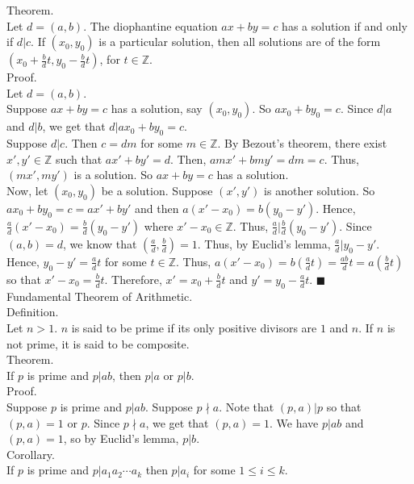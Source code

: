 \documentclass[twocolumn]{article}
\newcommand{\qed}{$\blacksquare$}
\newcommand{\integers}{\mathbb{Z}}
\begin{document}
Theorem. \\
Let $d = (a, b)$. The diophantine equation $ax + by = c$ has a solution if and only if $d | c$. If $(x_0, y_0)$ is a particular solution, then all solutions are of the form $\left( x_0 + \frac{b}{d}t, y_0 - \frac{b}{d}t \right)$, for $t \in \integers$. \\
Proof. \\
Let $d = (a, b)$. \\
Suppose $ax + by = c$ has a solution, say $(x_0, y_0)$. So $ax_0 + by_0 = c$. Since $d | a$ and $d | b$, we get that $d | ax_0 + by_0 = c$. \\
Suppose $d | c$. Then $c = dm$ for some $m \in \integers$. By Bezout's theorem, there exist $x', y' \in \integers$ such that $ax' + by' = d$. Then, $amx' + bmy' = dm = c$. Thus, $(mx', my')$ is a solution. So $ax + by = c$ has a solution. \\
Now, let $(x_0, y_0)$ be a solution. Suppose $(x', y')$ is another solution. So $ax_0 + by_0 = c = ax' + by'$ and then $a(x' - x_0) = b(y_0 - y')$. Hence, $\frac{a}{d}(x' - x_0) = \frac{b}{d}(y_0 - y')$ where $x' - x_0 \in \integers$. Thus, $\frac{a}{d} | \frac{b}{d}(y_0 - y')$. Since $(a, b) = d$, we know that $\left( \frac{a}{d}, \frac{b}{d} \right) = 1$. Thus, by Euclid's lemma, $\frac{a}{d} | y_0 - y'$. Hence, $y_0 - y' = \frac{a}{d}t$ for some $t \in \integers$. Thus, $a(x' - x_0) = b \left( \frac{a}{d}t \right) = \frac{ab}{d}t = a \left( \frac{b}{d}t \right)$ so that $x' - x_0 = \frac{b}{d}t$. Therefore, $x' = x_0 + \frac{b}{d}t$ and $y' = y_0 - \frac{a}{d}t$. \qed \\

Fundamental Theorem of Arithmetic. \\

Definition. \\
Let $n > 1$. $n$ is said to be prime if its only positive divisors are $1$ and $n$. If $n$ is not prime, it is said to be composite. \\

Theorem. \\
If $p$ is prime and $p | ab$, then $p | a$ or $p | b$. \\
Proof. \\
Suppose $p$ is prime and $p | ab$. Suppose $p \nmid a$. Note that $(p, a) | p$ so that $(p, a) = 1$ or $p$. Since $p \nmid a$, we get that $(p, a) = 1$. We have $p | ab$ and $(p, a) = 1$, so by Euclid's lemma, $p | b$. \\

Corollary. \\
If $p$ is prime and $p | a_1a_2 \cdots a_k$ then $p | a_i$ for some $1 \leq i \leq k$. \\
\end{document}
